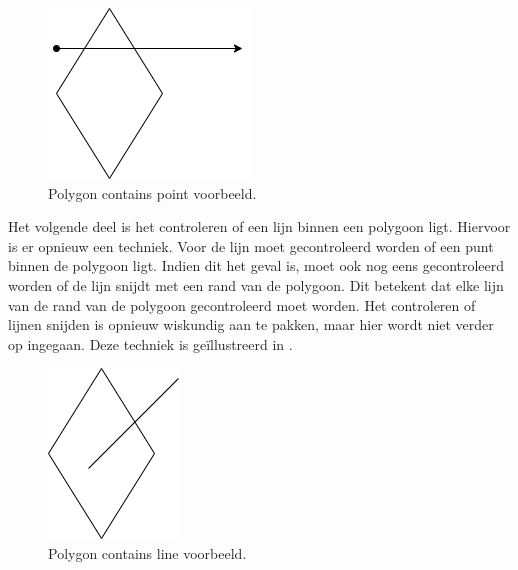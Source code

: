 \begin{figure}
    \centering
    \includegraphics[width=0.5\linewidth]{images/polygon_contains_point.png}
    \caption{Polygon contains point voorbeeld.}
    \label{fig:polygon_contains_point}
\end{figure}

Het volgende deel is het controleren of een lijn binnen een polygoon ligt. Hiervoor is er opnieuw een techniek. Voor de lijn moet gecontroleerd worden of een punt binnen de polygoon ligt. Indien dit het geval is, moet ook nog eens gecontroleerd worden of de lijn snijdt met een rand van de polygoon. Dit betekent dat elke lijn van de rand van de polygoon gecontroleerd moet worden. Het controleren of lijnen snijden is opnieuw wiskundig aan te pakken, maar hier wordt niet verder op ingegaan. Deze techniek is geïllustreerd in .

\begin{figure}
    \centering
    \includegraphics[width=0.3\linewidth]{images/polygon_contains_line.png}
    \caption{Polygon contains line voorbeeld.}
    \label{fig:polygon_contains_line}
\end{figure}

